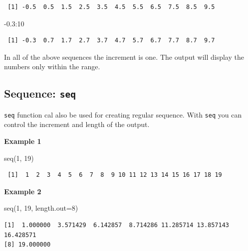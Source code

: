 \documentclass[
  letterpaper,
  DIV=11,
  numbers=noendperiod]{scrreprt}
\newenvironment{Shaded}{\begin{snugshade}}{\end{snugshade}}
\newcommand{\AttributeTok}[1]{\textcolor[rgb]{0.40,0.45,0.13}{#1}}
\newcommand{\DecValTok}[1]{\textcolor[rgb]{0.68,0.00,0.00}{#1}}
\newcommand{\FloatTok}[1]{\textcolor[rgb]{0.68,0.00,0.00}{#1}}
\newcommand{\FunctionTok}[1]{\textcolor[rgb]{0.28,0.35,0.67}{#1}}
\newcommand{\NormalTok}[1]{\textcolor[rgb]{0.00,0.23,0.31}{#1}}
\newcommand{\SpecialCharTok}[1]{\textcolor[rgb]{0.37,0.37,0.37}{#1}}
\begin{document}
\begin{verbatim}
 [1] -0.5  0.5  1.5  2.5  3.5  4.5  5.5  6.5  7.5  8.5  9.5
\end{verbatim}

\begin{Shaded}
\begin{Highlighting}[]
\SpecialCharTok{{-}}\FloatTok{0.3}\SpecialCharTok{:}\DecValTok{10}
\end{Highlighting}
\end{Shaded}

\begin{verbatim}
 [1] -0.3  0.7  1.7  2.7  3.7  4.7  5.7  6.7  7.7  8.7  9.7
\end{verbatim}

In all of the above sequences the increment is one. The output will
display the numbers only within the range.

\subsection{\texorpdfstring{Sequence:
\texttt{seq}}{Sequence: seq}}\label{sequence-seq}

\texttt{seq} function cal also be used for creating regular sequence.
With \texttt{seq} you can control the increment and length of the
output.

\textbf{Example 1}

\begin{Shaded}
\begin{Highlighting}[]
\FunctionTok{seq}\NormalTok{(}\DecValTok{1}\NormalTok{, }\DecValTok{19}\NormalTok{)}
\end{Highlighting}
\end{Shaded}

\begin{verbatim}
 [1]  1  2  3  4  5  6  7  8  9 10 11 12 13 14 15 16 17 18 19
\end{verbatim}

\textbf{Example 2}

\begin{Shaded}
\begin{Highlighting}[]
\FunctionTok{seq}\NormalTok{(}\DecValTok{1}\NormalTok{, }\DecValTok{19}\NormalTok{, }\AttributeTok{length.out=}\DecValTok{8}\NormalTok{)}
\end{Highlighting}
\end{Shaded}

\begin{verbatim}
[1]  1.000000  3.571429  6.142857  8.714286 11.285714 13.857143 16.428571
[8] 19.000000
\end{verbatim}
\end{document}

